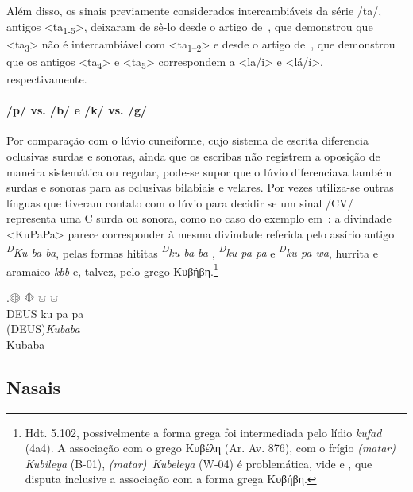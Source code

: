 Além disso, os sinais previamente considerados intercambiáveis da série
/ta/, antigos <ta\textsubscript{1-5}>, deixaram de sê-lo desde o artigo
de~\citet{Rieken2008}, que demonstrou que <ta\textsubscript{3}> não é
intercambiável com <ta\textsubscript{1--2}> e desde o artigo
de~\citet{RiekenYakubovich2010}, que demonstrou que os antigos
<ta\textsubscript{4}> e <ta\textsubscript{5}> correspondem a <la\slash{}i> e
<lá\slash{}í>, respectivamente.

\paragraph{/p/ vs. /b/ e /k/ vs. /g/}
Por comparação com o lúvio cuneiforme, cujo sistema de
escrita diferencia oclusivas surdas e sonoras, ainda que os escribas não
registrem a oposição de maneira sistemática ou regular, pode-se supor que o
lúvio diferenciava também surdas e sonoras para as oclusivas bilabiais e
velares.
Por vezes utiliza-se outras línguas que tiveram contato com o lúvio para
decidir se um sinal /CV/ representa uma C surda ou sonora, como no caso do
exemplo em~\Next: a divindade <KuPaPa> parece corresponder à mesma
divindade referida pelo assírio antigo \emph{\textsuperscript{D}Ku-ba-ba},
pelas formas hititas \emph{\textsuperscript{D}ku-ba-ba-},
\mbox{\emph{\textsuperscript{D}ku-pa-pa}} e \emph{\textsuperscript{D}ku-pa-wa},
hurrita e aramaico \emph{kbb} e, talvez, pelo grego Κυβήβη.\footnote{%
	Hdt. 5.102, possivelmente a forma grega foi intermediada pelo lídio
	\emph{kufad} (4a4).
	A associação com o grego Κυβέλη (Ar. Av. 876), com o frígio
	\emph{(matar) Kubileya} (B-01), \mbox{\emph{(matar) Kubeleya}} (\mbox{W-04})
	é problemática, vide \citet[280--1]{Obrador2020} e \citet{Oreshko2021},
	que disputa inclusive a associação com a forma grega Κυβήβη.
}


\exg.\Large 𔖖 \Large 𔗜 \Large 𔕸 \Large 𔕸\\
DEUS ku pa pa\\
(DEUS)\emph{Kubaba} \\
Kubaba


\subsection{Nasais}

